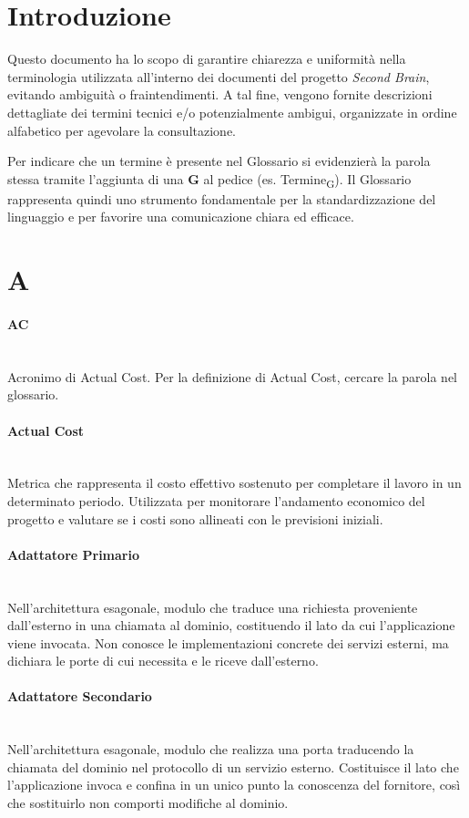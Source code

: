 \documentclass[a4paper, 10pt, colorlinks=true, linkcolor=black, urlcolor=blue, citecolor=blue, hidelinks]{article}
\newcommand{\glossaryterm}[2]{
    \paragraph{#1 \label{term:#1}} \mbox{} \\
    #2
    \vspace{0.5em}
}
\begin{document}
\newpage

\tableofcontents
\newpage


\section{Introduzione}
Questo documento ha lo scopo di garantire chiarezza e uniformità nella terminologia utilizzata all'interno dei documenti del progetto \textit{Second Brain}, evitando ambiguità o fraintendimenti. A tal fine, vengono fornite descrizioni dettagliate dei termini tecnici e/o potenzialmente ambigui, organizzate in ordine alfabetico per agevolare la consultazione.

Per indicare che un termine è presente nel Glossario si evidenzierà la parola stessa tramite l'aggiunta di una \textbf{G} al pedice (es. Termine\textsubscript{G}). Il Glossario rappresenta quindi uno strumento fondamentale per la standardizzazione del linguaggio e per favorire una comunicazione chiara ed efficace.

\newpage

\section*{A}

\glossaryterm{AC}{Acronimo di Actual Cost. Per la definizione di Actual Cost, cercare la parola nel glossario.}

\glossaryterm{Actual Cost}{Metrica che rappresenta il costo effettivo sostenuto per completare il lavoro in un determinato periodo. Utilizzata per monitorare l'andamento economico del progetto e valutare se i costi sono allineati con le previsioni iniziali.}

\glossaryterm{Adattatore Primario}{Nell'architettura esagonale, modulo che traduce una richiesta proveniente dall'esterno in una chiamata al dominio, costituendo il lato da cui l'applicazione viene invocata. Non conosce le implementazioni concrete dei servizi esterni, ma dichiara le porte di cui necessita e le riceve dall'esterno.}

\glossaryterm{Adattatore Secondario}{Nell'architettura esagonale, modulo che realizza una porta traducendo la chiamata del dominio nel protocollo di un servizio esterno. Costituisce il lato che l'applicazione invoca e confina in un unico punto la conoscenza del fornitore, così che sostituirlo non comporti modifiche al dominio.}
\end{document}
